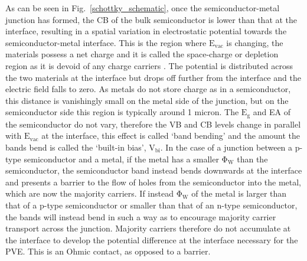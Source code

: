 \documentclass[11pt, twoside]{report}
\begin{document}
As can be seen in Fig.~\ref{schottky_schematic}, once the semiconductor-metal junction has formed, the CB of the bulk semiconductor is lower than that at the interface, resulting in a spatial variation in electrostatic potential towards the semiconductor-metal interface. This is the region where $\mathrm{E_{vac}}$ is changing, the materials possess a net charge and it is called the space-charge or depletion region as it is devoid of any charge carriers \cite{PV_bands_book}. The potential is distributed across the two materials at the interface but drops off further from the interface and the electric field falls to zero.  As metals do not store charge as in a semiconductor, this distance is vanishingly small on the metal side of the junction, but on the semiconductor side this region is typically around 1 micron. The $\mathrm{E_g}$ and EA of the semiconductor do not vary, therefore the VB and CB levels change in parallel with $\mathrm{E_{vac}}$ at the interface, this effect is called `band bending' and the amount the bands bend is called the `built-in bias', $\mathrm{V_{bi}}$.
In the case of a junction between a p-type semiconductor and a metal, if the metal has a smaller $\mathrm{\Phi_W}$ than the semiconductor, the semiconductor band instead bends downwards at the interface and presents a barrier to the flow of holes from the semiconductor into the metal, which are now the majority carriers.
If instead $\mathrm{\Phi_W}$ of the metal is larger than that of a p-type semiconductor or smaller than that of an n-type semiconductor, the bands will instead bend in such a way as to encourage majority carrier transport across the junction. Majority carriers therefore do not accumulate at the interface to develop the potential difference at the interface necessary for the PVE. This is an Ohmic contact, as opposed to a barrier. 
\end{document}
